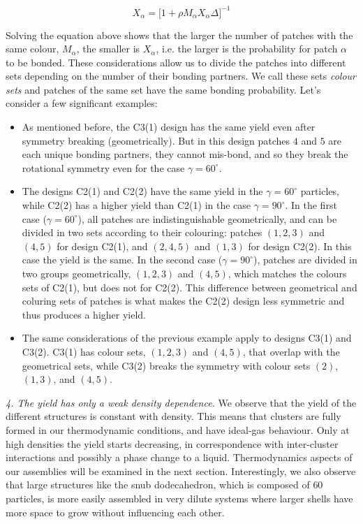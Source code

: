 \documentclass[a4paper, amsfonts, amssymb, amsmath, reprint, showkeys, nofootinbib, twoside]{revtex4-1}
\begin{document}
\begin{equation}
X_{\alpha}=\biggl[ 1+ \rho M_\alpha X_{\alpha} \Delta\biggr]^{-1}
\end{equation}

Solving the equation above shows that the larger the number of patches with the same colour, $M_\alpha$, the smaller is $X_\alpha$, i.e. the larger is the probability for patch $\alpha$ to be bonded. These considerations allow us to divide the patches into different sets depending on the number of their bonding partners. We call these sets \emph{colour sets} and patches of the same set have the same bonding probability. Let's consider a few significant examples:
\begin{itemize}
\item As mentioned before, the C3(1) design has the same yield even after symmetry breaking (geometrically). But in this design patches $4$ and $5$ are each unique bonding partners, they cannot mis-bond, and so they break the rotational symmetry even for the case $\gamma=60^\circ$.
\item The designs C2(1) and C2(2) have the same yield in the $\gamma=60^\circ$ particles, while C2(2) has a higher yield than C2(1) in the case $\gamma=90^\circ$. In the first case ($\gamma=60^\circ$), all patches are indistinguishable geometrically, and can be divided in two sets according to their colouring: patches $(1,2,3)$ and $(4,5)$ for design C2(1), and $(2,4,5)$ and $(1,3)$ for design C2(2). In this case the yield is the same. In the second case ($\gamma=90^\circ$), patches are divided in two groups geometrically, $(1,2,3)$ and $(4,5)$, which matches the colours sets of C2(1), but does not for C2(2). This difference between geometrical and coluring sets of patches is what makes the C2(2) design less symmetric and thus produces a higher yield.
\item The same considerations of the previous example apply to designs C3(1) and C3(2). C3(1) has colour sets, $(1,2,3)$ and $(4,5)$, that overlap with the geometrical sets, while C3(2) breaks the symmetry with colour sets $(2)$, $(1,3)$, and $(4,5)$.
\end{itemize}


\noindent
\emph{4. The yield has only a weak density dependence.} We observe that the yield of the different structures is constant with density. This means that clusters are fully formed in our thermodynamic conditions, and have ideal-gas behaviour. Only at high densities the yield starts decreasing, in correspondence with inter-cluster interactions and possibly a phase change to a liquid. Thermodynamics aspects of our assemblies will be examined in the next section. Interestingly, we also observe that large structures like the snub dodecahedron, which is composed of $60$ particles, is more easily assembled in very dilute systems where larger shells have more space to grow without influencing each other.
\end{document}
